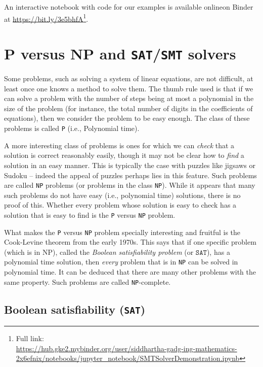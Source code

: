 \documentclass{amsart}
\theoremstyle{plain}
\theoremstyle{definition}
\theoremstyle{remark}
\begin{document}
An interactive notebook with code for our examples is available onlineon Binder at \url{https://bit.ly/3e5bhfA}\footnote{Full link:\\\url{https://hub.gke2.mybinder.org/user/siddhartha-gadg-ing-mathematics-2x6efnix/notebooks/jupyter_notebook/SMTSolverDemonstration.ipynb}}.

\hypertarget{p-versus-np-and-satsmt-solvers}{%
	\section{P versus NP and \texttt{SAT}/\texttt{SMT}
	  solvers}\label{p-versus-np-and-satsmt-solvers}}

Some problems, such as solving a system of linear equations, are not
difficult, at least once one knows a method to solve them. The thumb
rule used is that if we can solve a problem with the number of steps
being at most a polynomial in the size of the problem (for instance, the
total number of digits in the coefficients of equations), then we
consider the problem to be easy enough. The class of these problems is
called \texttt{P} (i.e., Polynomial time).

A more interesting class of problems is ones for which we can
\emph{check} that a solution is correct reasonably easily, though it may
not be clear how to \emph{find} a solution in an easy manner. This is
typically the case with puzzles like jigsaws or Sudoku -- indeed the
appeal of puzzles perhaps lies in this feature. Such problems are called
\texttt{NP} problems (or problems in the class \texttt{NP}). While it appears that
many such problems do not have easy (i.e., polynomial time) solutions,
there is no proof of this. Whether every problem whose solution is easy
to check has a solution that is easy to find is the \texttt{P} versus \texttt{NP}
problem.

What makes the \texttt{P} versus \texttt{NP} problem specially interesting and fruitful is the
Cook-Levine theorem from the early 1970s. This says that if one specific
problem (which is in NP), called the \emph{Boolean satisfiability problem} (or
\(\texttt{SAT}\)), has a polynomial time solution, then \emph{every} problem that
is in \texttt{NP} can be solved in polynomial time. It can be deduced that
there are many other problems with the same property. Such problems are
called \texttt{NP}-complete.

\subsection{Boolean satisfiability (\texttt{SAT})}
\end{document}
